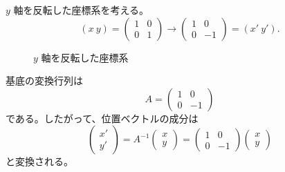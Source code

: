 \begin{example}[座標軸の反転]
$y$ 軸を反転した座標系を考える。
\[
 (\unit{x}\ \unit{y})
 =\begin{pmatrix}1&0\\0&1\end{pmatrix}
 \longrightarrow
 \begin{pmatrix}1&0\\0&-1\end{pmatrix}
 =(\unit{x}'\ \unit{y}').
\]

\begin{figure}[htbp]
\centering
{}
\caption{$y$ 軸を反転した座標系}
\end{figure}

基底の変換行列は
\[
 A=\begin{pmatrix}1&0\\0&-1\end{pmatrix}
\]
である。したがって、位置ベクトルの成分は
\begin{equation}
 \begin{pmatrix}x'\\y'\end{pmatrix}
 =A^{-1}\begin{pmatrix}x\\y\end{pmatrix}
 =\begin{pmatrix}1&0\\0&-1\end{pmatrix}
  \begin{pmatrix}x\\y\end{pmatrix}
\end{equation}
と変換される。
\end{example}
